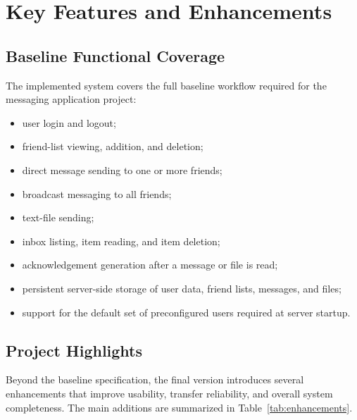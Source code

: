 \documentclass[conference]{IEEEtran}
\begin{document}
\vspace{0.7\baselineskip}
\section{Key Features and Enhancements}

\subsection{Baseline Functional Coverage}
The implemented system covers the full baseline workflow required for the messaging application project:
\begin{itemize}
	\item user login and logout;
	\item friend-list viewing, addition, and deletion;
	\item direct message sending to one or more friends;
	\item broadcast messaging to all friends;
	\item text-file sending;
	\item inbox listing, item reading, and item deletion;
	\item acknowledgement generation after a message or file is read;
	\item persistent server-side storage of user data, friend lists, messages, and files;
	\item support for the default set of preconfigured users required at server startup.
\end{itemize}

\subsection{Project Highlights}
Beyond the baseline specification, the final version introduces several enhancements that improve usability, transfer reliability, and overall system completeness. The main additions are summarized in Table~\ref{tab:enhancements}.
\end{document}
